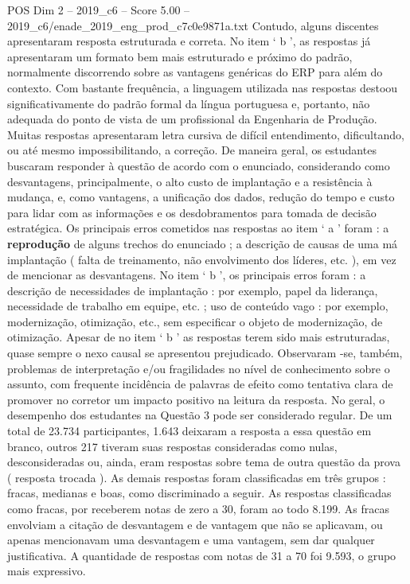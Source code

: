 \begin{textsample}{POS Dim 2 – 2019\_c6 – Score 5.00 – 2019\_c6/enade\_2019\_eng\_prod\_c7c0e9871a.txt}
Contudo, alguns discentes apresentaram resposta estruturada e correta.
No item ‘ b ’, as respostas já apresentaram um formato bem mais estruturado e próximo do padrão, normalmente discorrendo sobre as vantagens genéricas do ERP para além do contexto.
Com bastante frequência, a linguagem utilizada nas respostas destoou significativamente do padrão formal da língua portuguesa e, portanto, não adequada do ponto de vista de um profissional da Engenharia de Produção.
Muitas respostas apresentaram letra cursiva de difícil entendimento, dificultando, ou até mesmo impossibilitando, a correção.
De maneira geral, os estudantes buscaram responder à questão de acordo com o enunciado, considerando como desvantagens, principalmente, o alto custo de implantação e a resistência à mudança, e, como vantagens, a unificação dos dados, redução do tempo e custo para lidar com as informações e os desdobramentos para tomada de decisão estratégica.
Os principais erros cometidos nas respostas ao item ‘ a ’ foram : a \textbf{reprodução} de alguns trechos do enunciado ; a descrição de causas de uma má implantação ( falta de treinamento, não envolvimento dos líderes, etc. ), em vez de mencionar as desvantagens.
No item ‘ b ’, os principais erros foram : a descrição de necessidades de implantação : por exemplo, papel da liderança, necessidade de trabalho em equipe, etc. ; uso de conteúdo vago : por exemplo, modernização, otimização, etc., sem especificar o objeto de modernização, de otimização.
Apesar de no item ‘ b ’ as respostas terem sido mais estruturadas, quase sempre o nexo causal se apresentou prejudicado.
Observaram -se, também, problemas de interpretação e/ou fragilidades no nível de conhecimento sobre o assunto, com frequente incidência de palavras de efeito como tentativa clara de promover no corretor um impacto positivo na leitura da resposta.
No geral, o desempenho dos estudantes na Questão 3 pode ser considerado regular.
De um total de 23.734 participantes, 1.643 deixaram a resposta a essa questão em branco, outros 217 tiveram suas respostas consideradas como nulas, desconsideradas ou, ainda, eram respostas sobre tema de outra questão da prova ( resposta trocada ).
As demais respostas foram classificadas em três grupos : fracas, medianas e boas, como discriminado a seguir.
As respostas classificadas como fracas, por receberem notas de zero a 30, foram ao todo 8.199.
As fracas envolviam a citação de desvantagem e de vantagem que não se aplicavam, ou apenas mencionavam uma desvantagem e uma vantagem, sem dar qualquer justificativa.
A quantidade de respostas com notas de 31 a 70 foi 9.593, o grupo mais expressivo.

\end{textsample}
